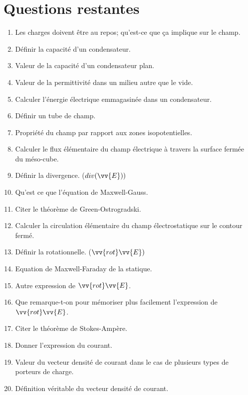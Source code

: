 \documentclass[a4paper, 11pt, hidelinks]{article}
\begin{document}
\section{Questions restantes}
\begin{enumerate}
    \item Les charges doivent être au repos; qu'est-ce que ça implique sur le champ. \cite{Chapitre9}
    \item Définir la capacité d'un condensateur. \cite{Chapitre9}
    \item Valeur de la capacité d'un condensateur plan. \cite{Chapitre9}
    \item Valeur de la permittivité dans un milieu autre que le vide. \cite{Chapitre9}
    \item Calculer l'énergie électrique emmagasinée dans un condensateur. \cite{Chapitre9}
    \item Définir un tube de champ. \cite{Chapitre9}
    \item Propriété du champ par rapport aux zones isopotentielles. \cite{Chapitre9}
    \item Calculer le flux élémentaire du champ électrique à travers la surface fermée du méso-cube. \cite{Chapitre10}
    \item Définir la divergence. ($div(\vv{E}))$ \cite{Chapitre10}
    \item Qu'est ce que l'équation de Maxwell-Gauss. \cite{Chapitre10}
    \item Citer le théorème de Green-Ostrogradski. \cite{Chapitre10} 
    \item Calculer la circulation élémentaire du champ électrostatique sur le contour fermé. \cite{Chapitre10}
    \item Définir la rotationnelle. ($\vv{rot}\vv{E})$ \cite{Chapitre10}
    \item Equation de Maxwell-Faraday de la statique. \cite{Chapitre10}
    \item Autre expression de $\vv{rot}\vv{E}$. \cite{Chapitre10}
    \item Que remarque-t-on pour mémoriser plus facilement l'expression de $\vv{rot}\vv{E}$. \cite{Chapitre10}
    \item Citer le théorème de Stokes-Ampère. \cite{Chapitre10}
    \item Donner l'expression du courant. \cite{Chapitre11}
    \item Valeur du vecteur densité de courant dans le cas de plusieurs types de porteurs de charge. \cite{Chapitre11}
    \item Définition véritable du vecteur densité de courant. \cite{Chapitre11}

\end{enumerate}
\end{document}
